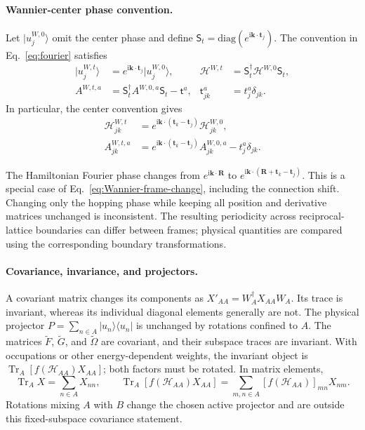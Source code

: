 \documentclass[prx,amsmath,amssymb,superscriptaddress,longbibliography]{revtex4-2}
\newcommand{\Tr}{\operatorname{Tr}}
\newcommand{\ii}{\mathrm{i}}
\begin{document}
\paragraph{Wannier-center phase convention.}
Let $|u_j^{W,0}\rangle$ omit the center phase and define
$\mathsf S_t=\mathrm{diag}(e^{\ii\bm k\cdot\bm t_j})$.
The convention in Eq.~\eqref{eq:fourier} satisfies
\begin{align}
 |u_j^{W,t}\rangle&=e^{\ii\bm k\cdot\bm t_j}|u_j^{W,0}\rangle,
 &\mathcal H^{W,t}&=\mathsf S_t^\dagger\mathcal H^{W,0}\mathsf S_t,
 \nonumber\\
 A^{W,t,a}&=\mathsf S_t^\dagger A^{W,0,a}\mathsf S_t-\mathsf t^a,
 &\mathsf t^a_{jk}&=t_j^a\delta_{jk}.
 \label{eq:center-gauge}
\end{align}
In particular, the center convention gives
\begin{align}
 \mathcal H_{jk}^{W,t}
 &=e^{\ii\bm k\cdot(\bm t_k-\bm t_j)}\mathcal H_{jk}^{W,0},\nonumber\\
 A_{jk}^{W,t,a}
 &=e^{\ii\bm k\cdot(\bm t_k-\bm t_j)}A_{jk}^{W,0,a}-t_j^a\delta_{jk}.
 \label{eq:center-gauge-components}
\end{align}

The Hamiltonian Fourier phase changes from $e^{\ii\bm k\cdot\bm R}$ to
$e^{\ii\bm k\cdot(\bm R+\bm t_k-\bm t_j)}$.
This is a special case of Eq.~\eqref{eq:Wannier-frame-change}, including the
connection shift. Changing only the hopping phase while keeping all position
and derivative matrices unchanged is inconsistent.
The resulting periodicity across reciprocal-lattice boundaries can differ
between frames; physical quantities are compared using the corresponding boundary transformations.

\paragraph{Covariance, invariance, and projectors.}
A covariant matrix changes its components as $X'_{AA}=W_A^\dagger X_{AA}W_A$.
Its trace is invariant, whereas its individual diagonal elements generally are not.
The physical projector $P=\sum_{n\in A}|u_n\rangle\langle u_n|$ is unchanged
by rotations confined to $A$. The matrices $\widetilde F$, $\widetilde G$,
and $\widetilde\Omega$ are covariant, and their subspace traces are invariant.
With occupations or other energy-dependent weights, the invariant object is
$\Tr_A[f(\mathcal H_{AA})X_{AA}]$; both factors must be rotated.
In matrix elements,
\begin{equation}
 \Tr_A X=\sum_{n\in A}X_{nn},\qquad
 \Tr_A[f(\mathcal H_{AA})X_{AA}]
 =\sum_{m,n\in A}[f(\mathcal H_{AA})]_{mn}X_{nm}.
 \label{eq:weighted-trace-components}
\end{equation}
Rotations mixing $A$ with $B$ change the chosen active projector and are outside
this fixed-subspace covariance statement.
\end{document}
